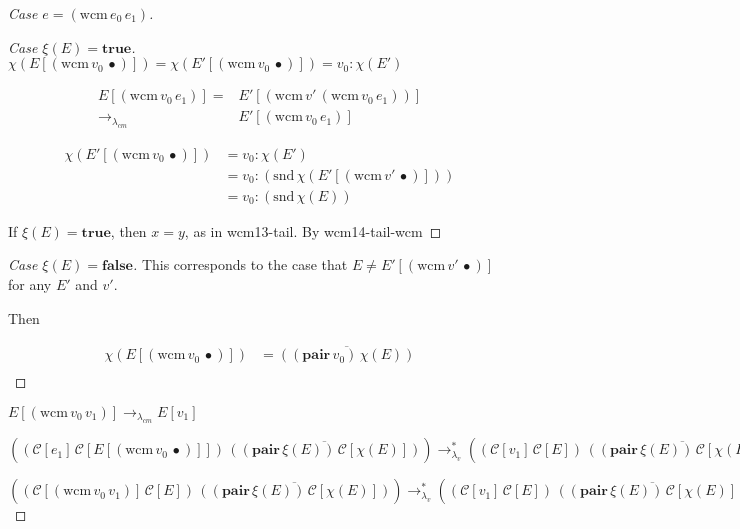 \documentclass[ms,electronic,twosidetoc,letterpaper,chaptercenter,parttop]{byumsphd}
\begin{document}
\begin{proof}[Case $e=(\mathrm{wcm}\,e_0\,e_1)$]
\begin{proof}[Case $\xi(E)=\mathbf{true}$]
$\chi(E[(\mathrm{wcm}\,v_0\,\bullet)])=\chi(E'[(\mathrm{wcm}\,v_0\,\bullet)])=v_0 : \chi(E')$

\begin{align*}
E[(\mathrm{wcm}\,v_0\,e_1)]= &E'[(\mathrm{wcm}\,v'\,(\mathrm{wcm}\,v_0\,e_1))]\\
\rightarrow_{\lambda_{cm}}   &E'[(\mathrm{wcm}\,v_0\,e_1)]
\end{align*}

\begin{align*}
\chi(E'[(\mathrm{wcm}\,v_0\,\bullet)]) &=v_0 : \chi(E')\\
                                       &=v_0 : (\mathrm{snd}\,\chi(E'[(\mathrm{wcm}\,v'\,\bullet)]))\\
                                       &=v_0 : (\mathrm{snd}\,\chi(E))
\end{align*}

If $\xi(E)=\mathbf{true}$, then $x=y$, as in wcm13-tail. By wcm14-tail-wcm
\end{proof}
\begin{proof}[Case $\xi(E)=\mathbf{false}$]
This corresponds to the case that $E\ne E'[(\mathrm{wcm}\,v'\,\bullet)]$ for any $E'$ and $v'$.

Then

\begin{align*}
\chi(E[(\mathrm{wcm}\,v_0\,\bullet)]) &=\overline{((\mathbf{pair}\,v_0)\,\chi(E))}\\
\end{align*}
\end{proof}

$E[(\mathrm{wcm}\,v_0\,v_1)]\rightarrow_{\lambda_{cm}}E[v_1]$

$((\mathcal{C}[e_1]\,\mathcal{C}[E[(\mathrm{wcm}\,v_0\,\bullet)]])\,\overline{((\mathbf{pair}\,\xi(E))\,\mathcal{C}[\chi(E)])})\rightarrow_{\lambda_v}^{*}((\mathcal{C}[v_1]\,\mathcal{C}[E])\,\overline{((\mathbf{pair}\,\xi(E))\,\mathcal{C}[\chi(E)])})$

$((\mathcal{C}[(\mathrm{wcm}\,v_0\,v_1)]\,\mathcal{C}[E])\,\overline{((\mathbf{pair}\,\xi(E))\,\mathcal{C}[\chi(E)])})\rightarrow_{\lambda_v}^{*}((\mathcal{C}[v_1]\,\mathcal{C}[E])\,\overline{((\mathbf{pair}\,\xi(E))\,\mathcal{C}[\chi(E)])})$


\end{proof}
\end{document}
